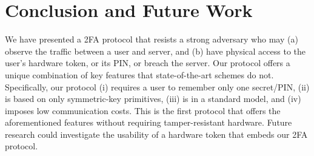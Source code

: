 

\section{Conclusion and Future Work}

We have presented a 2FA protocol that resists a strong adversary who may (a) observe the traffic between a user and server, and (b) have physical access to the user’s hardware token, or its PIN, or breach the server. Our protocol offers a unique combination of key features that state-of-the-art schemes do not. Specifically,  our protocol (i) requires a user to remember only one secret/PIN, (ii) is based on only symmetric-key primitives, (iii) is in a standard model, and (iv) imposes low communication costs. This is the first protocol that offers the aforementioned features without requiring tamper-resistant hardware. Future research could investigate the usability of a hardware token that embeds our 2FA protocol. 

